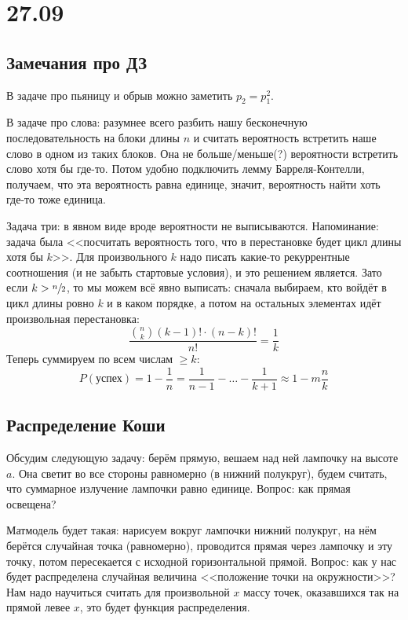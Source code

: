 
\section{27.09}
\subsection{Замечания про ДЗ}
В задаче про пьяницу и обрыв можно заметить $p_2=p_1^2$.

В задаче про слова: разумнее всего разбить нашу бесконечную последовательность
на блоки длины $n$ и считать вероятность встретить наше слово в одном из таких блоков.
Она не больше/меньше(?) вероятности встретить слово хотя бы где-то.
Потом удобно подключить лемму Барреля-Контелли, получаем, что эта вероятность равна единице,
значит, вероятность найти хоть где-то тоже единица.

Задача три: в явном виде вроде вероятности не выписываются.
Напоминание: задача была <<посчитать вероятность того, что в перестановке будет цикл длины хотя бы $k$>>.
Для произвольного $k$ надо писать какие-то рекуррентные соотношения (и не забыть стартовые условия),
и это решением является.
Зато если $k > \sfrac n2$, то мы можем всё явно выписать: сначала выбираем, кто войдёт в цикл длины ровно $k$
и в каком порядке, а потом на остальных элементах идёт произвольная перестановка:
\[ \frac{\binom{n}{k}(k-1)! \cdot (n-k)!}{n!} = \frac{1}{k} \]
Теперь суммируем по всем числам $\ge k$:
\[ P(\text{успех}) = 1 - \frac1n = \frac1{n-1} - \dots - \frac{1}{k+1} \approx 1 - m\frac{n}{k} \]

\subsection{Распределение Коши}
Обсудим следующую задачу: берём прямую, вешаем над ней лампочку на высоте $a$.
Она светит во все стороны равномерно (в нижний полукруг), будем считать, что суммарное излучение лампочки равно единице.
Вопрос: как прямая освещена?

Матмодель будет такая: нарисуем вокруг лампочки нижний полукруг, на нём берётся случайная точка (равномерно),
проводится прямая через лампочку и эту точку, потом пересекается с исходной горизонтальной прямой.
Вопрос: как у нас будет распределена случайная величина <<положение точки на окружности>>?
Нам надо научиться считать для произвольной $x$ массу точек, оказавшихся так на прямой левее $x$,
это будет функция распределения.

